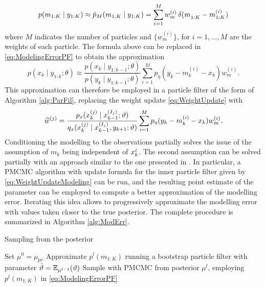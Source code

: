 \documentclass[10pt]{article}
\begin{document}
\begin{equation}
	p(m_{1:K} \mid y_{1:K}) \approx \hat{p}_{M}(m_{1:K} \mid y_{1:K}) = \sum_{i=1}^M w_m^{(i)} \, \delta(m^{\vphantom{(i)}}_{1:K} - m^{(i)}_{1:K})
\end{equation}
where $M$ indicates the number of particles and $\{w_m^{(i)}\}$, for $i = 1, \ldots, M$ are the weights of each particle. The formula above can be replaced in \eqref{eq:ModelingErrorPF} to obtain the approximation 
\begin{equation}
	p(x_k \mid y_{1:k}; \theta) \approx \frac{p(x_k \mid y_{1:k-1}; \theta)}{p(y_k \mid y_{1:k-1}; \theta)} \sum_{i=1}^M p_\eta(y_k - m^{(i)}_k - x_k) w_m^{(i)}.
\end{equation}
This approximation can therefore be employed in a particle filter of the form of Algorithm \ref{alg:ParFil}, replacing the weight update \eqref{eq:WeightUpdate} with
\begin{equation}\label{eq:WeightUpdateModeling}
	\widetilde w^{(j)} = \frac{p_x(x_k^{(j)} \mid x_{k-1}^{(I_j)}; \vartheta)}{q_x(x_k^{(j)} \mid x_{k-1}^{(I_j)}, y_{k+1}; \vartheta)}\sum_{i=1}^M p_\eta(y_k - m^{(i)}_k - x_k) w_m^{(i)}.
\end{equation}
Conditioning the modelling to the observations partially solves the issue of the assumption of $m_k$ being independent of $x^\varepsilon_k$. The second assumption can be solved partially with an approach similar to the one presented in \cite{CDS18}. In particular, a PMCMC algorithm with update formula for the inner particle filter given by \eqref{eq:WeightUpdateModeling} can be run, and the resulting point estimate of the parameter can be employed to compute a better approximation of the modelling error. Iterating this idea allows to progressively approximate the modelling error with values taken closer to the true posterior. The complete procedure is summarized in Algorithm \ref{alg:ModErr}.

\begin{algorithm}[t]
	\caption{Sampling from the posterior}
	\label{alg:ModErr}
	Set $\mu^0 = \mu_{\mathrm pr}$ \;
	 {
		Approximate $p^l(m_{1:K})$ running a bootstrap particle filter with parameter $\bar {\vartheta} = \operatorname{\mathbb{E}}_{\mu^{l-1}}(\vartheta)$ \;
		Sample with PMCMC from posterior $\mu^l$, employing $p^l(m_{1:K})$ in \eqref{eq:ModelingErrorPF} \;
	}
\end{algorithm}
\end{document}
